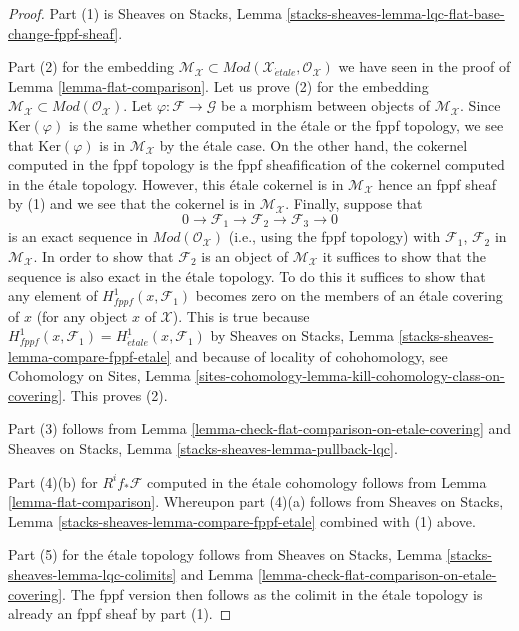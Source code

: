\begin{proof}
Part (1) is
Sheaves on Stacks, Lemma
\ref{stacks-sheaves-lemma-lqc-flat-base-change-fppf-sheaf}.

\medskip\noindent
Part (2) for the embedding $\mathcal{M}_\mathcal{X} \subset
\textit{Mod}(\mathcal{X}_{\acute{e}tale}, \mathcal{O}_\mathcal{X})$
we have seen in the proof of
Lemma \ref{lemma-flat-comparison}.
Let us prove (2) for the embedding
$\mathcal{M}_\mathcal{X} \subset \textit{Mod}(\mathcal{O}_\mathcal{X})$.
Let $\varphi : \mathcal{F} \to \mathcal{G}$ be a morphism between
objects of $\mathcal{M}_\mathcal{X}$. Since $\text{Ker}(\varphi)$
is the same whether computed in the \'etale or the fppf
topology, we see that $\text{Ker}(\varphi)$ is in
$\mathcal{M}_\mathcal{X}$ by the \'etale case. On the other hand,
the cokernel computed in the fppf topology is the fppf sheafification
of the cokernel computed in the \'etale topology. However, this
\'etale cokernel is in $\mathcal{M}_\mathcal{X}$ hence an fppf sheaf
by (1) and we see that the cokernel is in $\mathcal{M}_\mathcal{X}$.
Finally, suppose that
$$
0 \to \mathcal{F}_1 \to \mathcal{F}_2 \to \mathcal{F}_3 \to 0
$$
is an exact sequence in $\textit{Mod}(\mathcal{O}_\mathcal{X})$
(i.e., using the fppf topology) with $\mathcal{F}_1$, $\mathcal{F}_2$
in $\mathcal{M}_\mathcal{X}$. In order to show that $\mathcal{F}_2$
is an object of $\mathcal{M}_\mathcal{X}$ it suffices to show that
the sequence is also exact in the \'etale topology. To do this it
suffices to show that any element of $H^1_{fppf}(x, \mathcal{F}_1)$
becomes zero on the members of an \'etale covering of $x$ (for any
object $x$ of $\mathcal{X}$). This is true because
$H^1_{fppf}(x, \mathcal{F}_1) = H^1_{\acute{e}tale}(x, \mathcal{F}_1)$ by
Sheaves on Stacks, Lemma \ref{stacks-sheaves-lemma-compare-fppf-etale}
and because of locality of cohohomology, see
Cohomology on Sites, Lemma
\ref{sites-cohomology-lemma-kill-cohomology-class-on-covering}.
This proves (2).

\medskip\noindent
Part (3) follows from
Lemma \ref{lemma-check-flat-comparison-on-etale-covering}
and
Sheaves on Stacks, Lemma \ref{stacks-sheaves-lemma-pullback-lqc}.

\medskip\noindent
Part (4)(b) for $R^if_*\mathcal{F}$ computed in the \'etale cohomology
follows from Lemma \ref{lemma-flat-comparison}.
Whereupon part (4)(a) follows from
Sheaves on Stacks, Lemma \ref{stacks-sheaves-lemma-compare-fppf-etale}
combined with (1) above.

\medskip\noindent
Part (5) for the \'etale topology follows from
Sheaves on Stacks, Lemma \ref{stacks-sheaves-lemma-lqc-colimits} and
Lemma \ref{lemma-check-flat-comparison-on-etale-covering}.
The fppf version then follows as the colimit in the \'etale
topology is already an fppf sheaf by part (1).
\end{proof}

